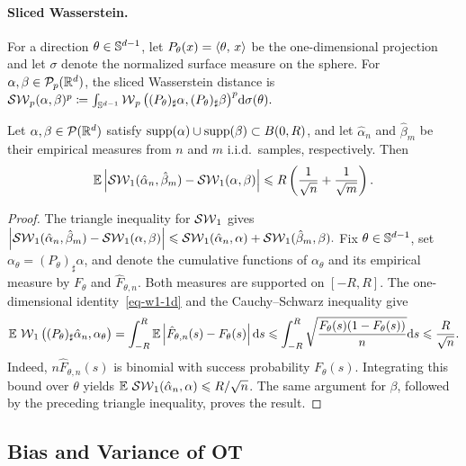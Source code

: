 \paragraph{Sliced Wasserstein.}
For a direction \(\theta\in\mathbb{S}^{d-1}\), let \(P_\theta(x)=\langle \theta,\,x\rangle\) be the one-dimensional projection and let \(\sigma\) denote the normalized surface measure on the sphere. For \(\alpha,\beta\in\mathcal{P}_p(\mathbb{R}^d)\), the sliced Wasserstein distance is
\(\operatorname{\mathcal{SW}}_p(\alpha,\beta)^p \coloneqq \int_{\mathbb{S}^{d-1}} \operatorname{\mathcal{W}}_p\big((P_\theta)_\sharp\alpha,(P_\theta)_\sharp\beta\big)^p \mathrm{d}\sigma(\theta).\)
\begin{thm}\label{thm-sliced-sample-complexity}
Let \(\alpha,\beta\in\mathcal{P}(\mathbb{R}^d)\) satisfy
\(\operatorname{supp}(\alpha)\cup\operatorname{supp}(\beta)\subset B(0,R)\), and let
\(\hat\alpha_n\) and \(\hat\beta_m\) be their empirical measures from \(n\) and \(m\) i.i.d.\ samples, respectively. Then
\[
\mathbb{E}\left\lvert\operatorname{\mathcal{SW}}_1(\hat\alpha_n,\hat\beta_m)-\operatorname{\mathcal{SW}}_1(\alpha,\beta)\right\rvert
\leqslant
R\left(\frac{1}{\sqrt n}+\frac{1}{\sqrt m}\right).
\]
\end{thm}
\begin{proof}
The triangle inequality for \(\operatorname{\mathcal{SW}}_1\) gives \(\left\lvert\operatorname{\mathcal{SW}}_1(\hat\alpha_n,\hat\beta_m)-\operatorname{\mathcal{SW}}_1(\alpha,\beta)\right\rvert \leqslant \operatorname{\mathcal{SW}}_1(\hat\alpha_n,\alpha)+\operatorname{\mathcal{SW}}_1(\hat\beta_m,\beta).\)
Fix \(\theta\in\mathbb{S}^{d-1}\), set \(\alpha_\theta=(P_\theta)_\sharp\alpha\), and denote the cumulative functions of \(\alpha_\theta\) and its empirical measure by \(F_\theta\) and \(\hat F_{\theta,n}\). Both measures are supported on \([-R,R]\). The one-dimensional identity~\eqref{eq-w1-1d} and the Cauchy--Schwarz inequality give
\[
\mathbb{E}\,\operatorname{\mathcal{W}}_1\big((P_\theta)_\sharp\hat\alpha_n,\alpha_\theta\big)
=
\int_{-R}^R \mathbb{E}\left\lvert\hat F_{\theta,n}(s)-F_\theta(s)\right\rvert\mathrm{d} s
\leqslant
\int_{-R}^R \sqrt{\frac{F_\theta(s)(1-F_\theta(s))}{n}}\mathrm{d} s
\leqslant
\frac{R}{\sqrt n}.
\]
Indeed, \(n\hat F_{\theta,n}(s)\) is binomial with success probability \(F_\theta(s)\). Integrating this bound over \(\theta\) yields \(\mathbb{E}\,\operatorname{\mathcal{SW}}_1(\hat\alpha_n,\alpha)\leqslant R/\sqrt n\). The same argument for \(\beta\), followed by the preceding triangle inequality, proves the result.
\end{proof}
\subsection{Bias and Variance of OT}
\label{sec-bias-variance-ot}
